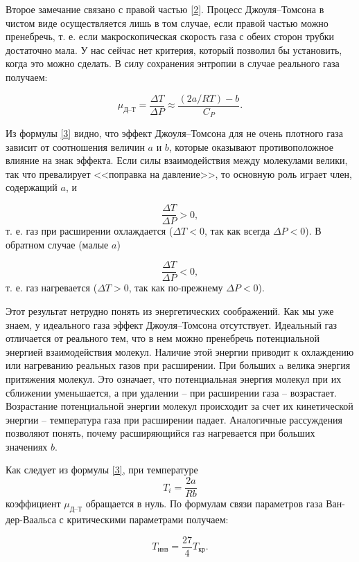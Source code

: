 \documentclass[a4paper,12pt]{article} %
\begin{document}
Второе замечание связано с правой частью \eqref{2}. Процесс Джоуля–Томсона в чистом виде осуществляется лишь в том случае, если правой частью можно пренебречь, т. е. если макроскопическая скорость газа с обеих сторон трубки достаточно мала. У нас сейчас нет критерия, который позволил бы установить, когда это можно сделать. В силу сохранения энтропии в случае реального газа получаем:

\begin{equation}\label{3}
\mu_\text{Д--Т} = \frac{\Delta T}{\Delta P} \approx \frac{(2a/RT) - b}{C_P}.
\end{equation}

Из формулы \eqref{3} видно, что эффект Джоуля–Томсона для не очень плотного газа зависит от соотношения величин $ a $ и $ b $, которые оказывают противоположное влияние на знак эффекта. Если силы взаимодействия между молекулами велики, так что превалирует <<поправка на давление>>, то основную роль играет член, содержащий $ a $, и 

\[ \frac{\Delta T}{\Delta P} > 0, \]
т. е. газ при расширении охлаждается ($ \Delta T < 0 $, так как всегда $ \Delta P < 0 $). В обратном случае (малые $ a $)

\[ \frac{\Delta T}{\Delta P} < 0, \]
т. е. газ нагревается ($ \Delta T > 0 $, так как по-прежнему $ \Delta P < 0 $).

Этот результат нетрудно понять из энергетических соображений. Как мы уже знаем, у идеального газа эффект Джоуля–Томсона отсутствует. Идеальный газ отличается от реального тем, что в нем можно пренебречь потенциальной энергией взаимодействия молекул. Наличие этой энергии приводит к охлаждению или нагреванию реальных газов при расширении. При больших a велика энергия притяжения молекул. Это означает, что потенциальная энергия молекул при их сближении уменьшается, а при удалении -- при расширении газа -- возрастает. Возрастание потенциальной энергии молекул происходит за счет их кинетической энергии -- температура газа при расширении падает. Аналогичные рассуждения позволяют понять, почему расширяющийся газ нагревается при больших значениях $ b $.

Как следует из формулы \eqref{3}, при температуре \[ T_i = \frac{2a}{Rb} \] коэффициент $ \mu_\text{Д--Т} $ обращается в нуль. По формулам связи параметров газа Ван-дер-Ваальса с критическими параметрами получаем: 

\begin{equation}\label{4}
T_\text{инв} = \frac{27}{4} T_\text{кр}.
\end{equation}
\end{document}
